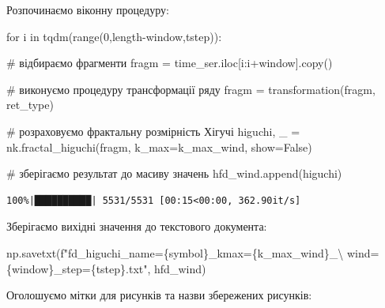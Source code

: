 \documentclass[
  letterpaper,
]{report}
\newenvironment{Shaded}{\begin{snugshade}}{\end{snugshade}}
\newcommand{\BuiltInTok}[1]{\textcolor[rgb]{0.00,0.23,0.31}{#1}}
\newcommand{\CharTok}[1]{\textcolor[rgb]{0.13,0.47,0.30}{#1}}
\newcommand{\CommentTok}[1]{\textcolor[rgb]{0.37,0.37,0.37}{#1}}
\newcommand{\ControlFlowTok}[1]{\textcolor[rgb]{0.00,0.23,0.31}{#1}}
\newcommand{\DecValTok}[1]{\textcolor[rgb]{0.68,0.00,0.00}{#1}}
\newcommand{\KeywordTok}[1]{\textcolor[rgb]{0.00,0.23,0.31}{#1}}
\newcommand{\NormalTok}[1]{\textcolor[rgb]{0.00,0.23,0.31}{#1}}
\newcommand{\OperatorTok}[1]{\textcolor[rgb]{0.37,0.37,0.37}{#1}}
\newcommand{\SpecialCharTok}[1]{\textcolor[rgb]{0.37,0.37,0.37}{#1}}
\newcommand{\SpecialStringTok}[1]{\textcolor[rgb]{0.13,0.47,0.30}{#1}}
\newcommand{\VariableTok}[1]{\textcolor[rgb]{0.07,0.07,0.07}{#1}}
\begin{document}
Розпочинаємо віконну процедуру:

\begin{Shaded}
\begin{Highlighting}[]
\ControlFlowTok{for}\NormalTok{ i }\KeywordTok{in}\NormalTok{ tqdm(}\BuiltInTok{range}\NormalTok{(}\DecValTok{0}\NormalTok{,length}\OperatorTok{{-}}\NormalTok{window,tstep)):}
    
    \CommentTok{\# відбираємо фрагменти}
\NormalTok{    fragm }\OperatorTok{=}\NormalTok{ time\_ser.iloc[i:i}\OperatorTok{+}\NormalTok{window].copy()  }

    \CommentTok{\# виконуємо процедуру трансформації ряду }
\NormalTok{    fragm }\OperatorTok{=}\NormalTok{ transformation(fragm, ret\_type)}

    \CommentTok{\# розраховуємо фрактальну розмірність Хігучі}
\NormalTok{    higuchi, \_ }\OperatorTok{=}\NormalTok{ nk.fractal\_higuchi(fragm, }
\NormalTok{                                    k\_max}\OperatorTok{=}\NormalTok{k\_max\_wind, }
\NormalTok{                                    show}\OperatorTok{=}\VariableTok{False}\NormalTok{)}

    \CommentTok{\# зберігаємо результат до масиву значень}
\NormalTok{    hfd\_wind.append(higuchi)}
\end{Highlighting}
\end{Shaded}

\begin{verbatim}
100%|██████████| 5531/5531 [00:15<00:00, 362.90it/s]
\end{verbatim}

Зберігаємо вихідні значення до текстового документа:

\begin{Shaded}
\begin{Highlighting}[]
\NormalTok{np.savetxt(}\SpecialStringTok{f"fd\_higuchi\_name=}\SpecialCharTok{\{}\NormalTok{symbol}\SpecialCharTok{\}}\SpecialStringTok{\_kmax=}\SpecialCharTok{\{}\NormalTok{k\_max\_wind}\SpecialCharTok{\}}\SpecialStringTok{\_}\CharTok{\textbackslash{}}
\SpecialStringTok{           wind=}\SpecialCharTok{\{}\NormalTok{window}\SpecialCharTok{\}}\SpecialStringTok{\_step=}\SpecialCharTok{\{}\NormalTok{tstep}\SpecialCharTok{\}}\SpecialStringTok{.txt"}\NormalTok{, hfd\_wind)}
\end{Highlighting}
\end{Shaded}

Оголошуємо мітки для рисунків та назви збережених рисунків:
\end{document}
